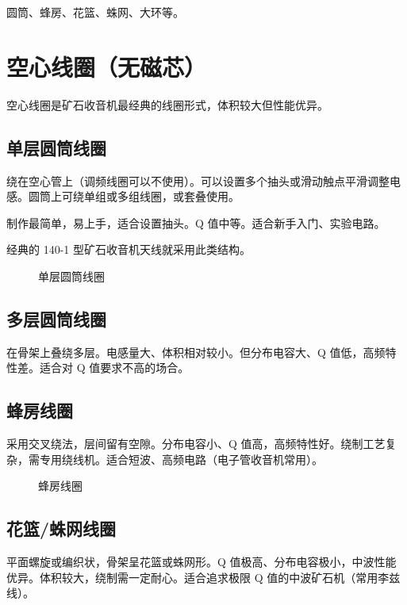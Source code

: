 \documentclass[12pt,UTF8]{ctexbook}
\begin{document}
圆筒、蜂房、花篮、蛛网、大环等。


\section{空心线圈（无磁芯）}

空心线圈是矿石收音机最经典的线圈形式，体积较大但性能优异。

\subsection{单层圆筒线圈}

绕在空心管上（调频线圈可以不使用）。可以设置多个抽头或滑动触点平滑调整电感。圆筒上可绕单组或多组线圈，或套叠使用。

制作最简单，易上手，适合设置抽头。Q 值中等。适合新手入门、实验电路。

经典的 140-1 型矿石收音机天线就采用此类结构。

\begin{figure}[H]
	\centering
	\caption{单层圆筒线圈}
	\label{fig:single-layer-coil}
\end{figure}

\subsection{多层圆筒线圈}

在骨架上叠绕多层。电感量大、体积相对较小。但分布电容大、Q 值低，高频特性差。适合对 Q 值要求不高的场合。

\subsection{蜂房线圈}

采用交叉绕法，层间留有空隙。分布电容小、Q 值高，高频特性好。绕制工艺复杂，需专用绕线机。适合短波、高频电路（电子管收音机常用）。

\begin{figure}[H]
	\centering
	\caption{蜂房线圈}
	\label{fig:honeycomb-coil}
\end{figure}

\subsection{花篮/蛛网线圈}

平面螺旋或编织状，骨架呈花篮或蛛网形。Q 值极高、分布电容极小，中波性能优异。体积较大，绕制需一定耐心。适合追求极限 Q 值的中波矿石机（常用李兹线）。
\end{document}
